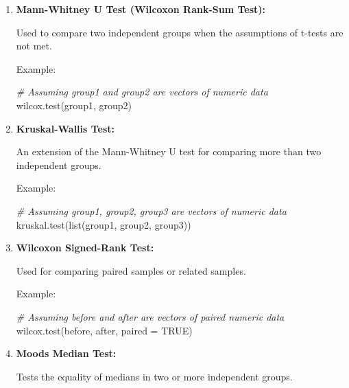 \documentclass[
]{article}
\newenvironment{Shaded}{}{}
\newcommand{\AttributeTok}[1]{\textcolor[rgb]{0.49,0.56,0.16}{#1}}
\newcommand{\CommentTok}[1]{\textcolor[rgb]{0.38,0.63,0.69}{\textit{#1}}}
\newcommand{\ConstantTok}[1]{\textcolor[rgb]{0.53,0.00,0.00}{#1}}
\newcommand{\FunctionTok}[1]{\textcolor[rgb]{0.02,0.16,0.49}{#1}}
\newcommand{\NormalTok}[1]{#1}
\begin{document}
\begin{enumerate}
\def\labelenumi{\arabic{enumi}.}
\item
  \textbf{Mann-Whitney U Test (Wilcoxon Rank-Sum Test):}

  Used to compare two independent groups when the assumptions of t-tests
  are not met.

  Example:

\begin{Shaded}
\begin{Highlighting}[]
\CommentTok{\# Assuming \textquotesingle{}group1\textquotesingle{} and \textquotesingle{}group2\textquotesingle{} are vectors of numeric data}
\FunctionTok{wilcox.test}\NormalTok{(group1, group2)}
\end{Highlighting}
\end{Shaded}
\item
  \textbf{Kruskal-Wallis Test:}

  An extension of the Mann-Whitney U test for comparing more than two
  independent groups.

  Example:

\begin{Shaded}
\begin{Highlighting}[]
\CommentTok{\# Assuming \textquotesingle{}group1\textquotesingle{}, \textquotesingle{}group2\textquotesingle{}, \textquotesingle{}group3\textquotesingle{} are vectors of numeric data}
\FunctionTok{kruskal.test}\NormalTok{(}\FunctionTok{list}\NormalTok{(group1, group2, group3))}
\end{Highlighting}
\end{Shaded}
\item
  \textbf{Wilcoxon Signed-Rank Test:}

  Used for comparing paired samples or related samples.

  Example:

\begin{Shaded}
\begin{Highlighting}[]
\CommentTok{\# Assuming \textquotesingle{}before\textquotesingle{} and \textquotesingle{}after\textquotesingle{} are vectors of paired numeric data}
\FunctionTok{wilcox.test}\NormalTok{(before, after, }\AttributeTok{paired =} \ConstantTok{TRUE}\NormalTok{)}
\end{Highlighting}
\end{Shaded}
\item
  \textbf{Mood\textquotesingle s Median Test:}

  Tests the equality of medians in two or more independent groups.


\end{enumerate}
\end{document}
